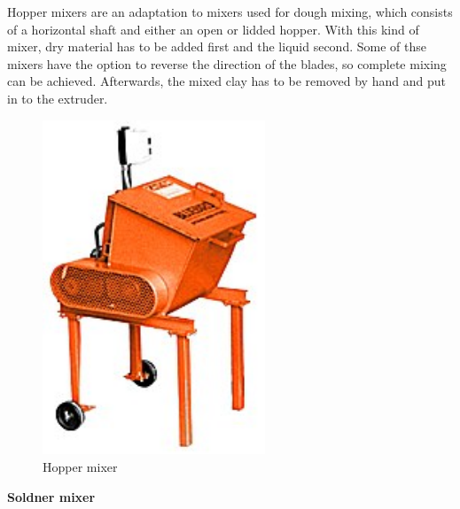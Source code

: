 \documentclass[12pt, a4paper]{article}
\begin{document}
Hopper mixers are an adaptation to mixers used for dough mixing, which consists of a horizontal shaft and either an open or lidded hopper. With this kind of mixer, dry material has to be added first and the liquid second. Some of thse mixers have the option to reverse the direction of the blades, so complete mixing can be achieved. Afterwards, the mixed clay has to be removed by hand and put in to the extruder.
\begin{figure}[H]
	\centering
	\includegraphics[height=10cm, keepaspectratio]{hoppermixer}
	\caption{Hopper mixer}
\end{figure}
	\newpage

\textbf{Soldner mixer}
\end{document}
